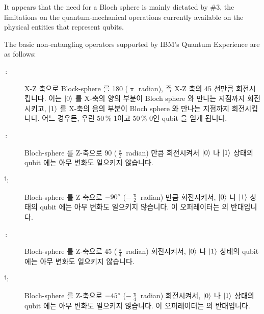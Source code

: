 It appears that the need for a Bloch sphere is mainly dictated by \#3,
the limitations on the quantum-mechanical operations currently available
on the physical entities that represent qubits.

The basic non-entangling operators supported by IBM's Quantum Experience
are as follows:
\fi

\begin{description}
\item[\,:]
	X-Z 축으로 Block-sphere 를 180\degree{} ($\uppi$ radian), 즉 X-Z 축의
	45\degree{} 선만큼 회전시킵니다.  이는 $\ket{0}$ 를 X-축의 양의 부분이
	Bloch sphere 와 만나는 지점까지 회전시키고, $\ket{1}$ 를 X-축의 음의
	부분이 Bloch sphere 와 만나는 지점까지 회전시킵니다.
	어느 경우든, 우린 50\,\% 1이고 50\,\% 0인 qubit 을 얻게 됩니다.

\item[\,:]
	Bloch-sphere 를 Z-축으로 90\degree{} ($\frac{\uppi}{2}$ radian) 만큼
	회전시켜서 $\ket{0}$ 나 $\ket{1}$ 상태의 qubit 에는 아무 변화도
	일으키지 않습니다.

\item[$^{\bm{\dagger}}$:]
	Bloch-sphere 를 Z-축으로 $-90\degree$ ($-\frac{\uppi}{2}$ radian) 만큼
	회전시켜서, $\ket{0}$ 나 $\ket{1}$ 상태의 qubit 에는 아무 변화도
	일으키지 않습니다.
	이 오퍼레이터는  의 반대입니다.

\item[\,:]
	Bloch-sphere 를 Z-축으로 45\degree{} ($\frac{\uppi}{4}$ radian)
	회전시켜서, $\ket{0}$ 나 $\ket{1}$ 상태의 qubit 에는 아무 변화도
	일으키지 않습니다.

\item[$^{\bm{\dagger}}$:]
	Bloch-sphere 를 Z-축으로 $-45\degree{}$ ($-\frac{\uppi}{4}$ radian)
	회전시켜서, $\ket{0}$ 나 $\ket{1}$ 상태의 qubit 에는 아무 변화도
	일으키지 않습니다.
	이 오퍼레이터는  의 반대입니다.
	\iffalse


\end{description}
